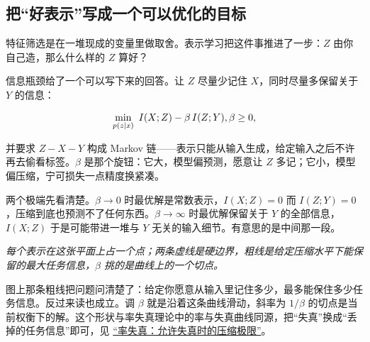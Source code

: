\subsection{把``好表示''写成一个可以优化的目标}

特征筛选是在一堆现成的变量里做取舍。表示学习把这件事推进了一步：\(Z\) 由你自己造，那么什么样的 \(Z\) 算好？

信息瓶颈给了一个可以写下来的回答。让 \(Z\) 尽量少记住 \(X\)，同时尽量多保留关于 \(Y\) 的信息：

\[
\min_{p(z\mid x)}\ I(X;Z)-\beta\, I(Z;Y),\space \beta\ge 0,
\]

并要求 \(Z-X-Y\) 构成 Markov 链——表示只能从输入生成，给定输入之后不许再去偷看标签。\(\beta\) 是那个旋钮：它大，模型偏预测，愿意让 \(Z\) 多记；它小，模型偏压缩，宁可损失一点精度换紧凑。

两个极端先看清楚。\(\beta\to 0\) 时最优解是常数表示，\(I(X;Z)=0\) 而 \(I(Z;Y)=0\)，压缩到底也预测不了任何东西。\(\beta\to\infty\) 时最优解保留关于 \(Y\) 的全部信息，\(I(X;Z)\) 于是可能带进一堆与 \(Y\) 无关的输入细节。有意思的是中间那一段。

\begin{center}
\end{center}

\emph{每个表示在这张平面上占一个点；两条虚线是硬边界，粗线是给定压缩水平下能保留的最大任务信息，\(\beta\) 挑的是曲线上的一个切点。}

图上那条粗线把问题问清楚了：给定你愿意从输入里记住多少，最多能保住多少任务信息。反过来读也成立。调 \(\beta\) 就是沿着这条曲线滑动，斜率为 \(1/\beta\) 的切点是当前权衡下的解。这个形状与率失真理论中的率与失真曲线同源，把``失真''换成``丢掉的任务信息''即可，见 \hyperref[sec:07-Information-Theory/04-Source-Coding/05]{``率失真：允许失真时的压缩极限''}。

